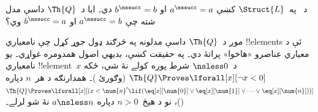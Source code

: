\documentclass[../../../include/open-logic-section]{subfiles}
\begin{document}
\begin{prob}
د~ په~$\Struct{L}$ کښې
$a^\nssucc=a$ او $b^\nssucc=b$ دي۔ ايا د~$\Th{Q}$ داسې مدل شته چې
$a^\nssucc=b$ او $b^\nssucc=a$ وي؟
\end{prob}

\begin{explain}
موږ د~$\Th{Q}$ داسې مدلونه په څرګند ډول جوړ کړل چې نامعياري
!!{element}s ئې د معياري عناصرو «هاخوا» پراتۀ دي۔ په حقيقت کښې،
بديهي اصول همدومره غواړي۔ يو نامعياري !!{element}~$x$ د~${} \nsless 0$ شرط
پوره کولے نۀ شي، ځکه $\Th{Q} \Proves
\lforall[x][\lnot x<0]$ (وګورئ
)۔ همدارنګه د هر~$n$ دپاره
$\Th{Q} \Proves \lforall[x][(x < \num{n}' \lif
(\eq[x][\num{0}] \lor \eq[x][\num{1}] \lor \dots \lor
\eq[x][\num{n}]))]$ ()، نو د
هېڅ~$n>0$ دپاره $a\nsless n$ نۀ شو لرلے۔
\end{explain}
\end{document}
